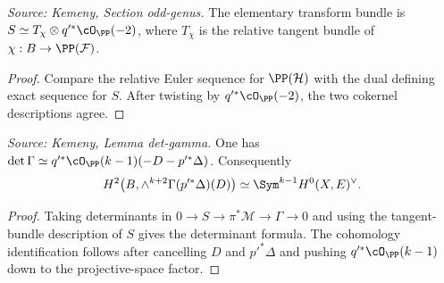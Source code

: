 \begin{lemma}
  \label{lem:kemeny_odd_S_relative_tangent}
  \textit{Source: Kemeny, Section odd-genus.}
  The elementary transform bundle is
  \(S\simeq T_\chi\otimes q'^*\cO_{\PP}(-2)\), where \(T_\chi\) is the relative
  tangent bundle of \(\chi:B\to\PP(\mathcal F)\).
\end{lemma}
\begin{proof}
  Compare the relative Euler sequence for \(\PP(\mathcal H)\) with the dual
  defining exact sequence for \(S\).  After twisting by \(q'^*\cO_{\PP}(-2)\),
  the two cokernel descriptions agree.
\end{proof}

\begin{lemma}
  \label{lem:kemeny_odd_det_gamma}
  \textit{Source: Kemeny, Lemma det-gamma.}
  One has
  \(\det\Gamma\simeq q'^*\cO_{\PP}(k-1)(-D-p'^*\Delta)\).  Consequently
  \[
    H^2\bigl(B,\wedge^{k+2}\Gamma(p'^*\Delta)(D)\bigr)
    \simeq \Sym^{k-1}H^0(X,E)^\vee .
  \]
\end{lemma}
\begin{proof}
  Taking determinants in \(0\to S\to\pi^*\mathcal M\to\Gamma\to0\) and using
  the tangent-bundle description of \(S\) gives the determinant formula.  The
  cohomology identification follows after cancelling \(D\) and \(p'^*\Delta\)
  and pushing \(q'^*\cO_{\PP}(k-1)\) down to the projective-space factor.
\end{proof}


